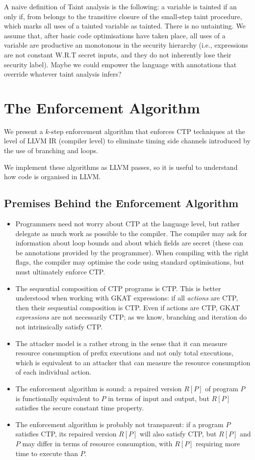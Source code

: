 A naive definition of Taint analysis is the following: a variable is tainted if an only if, from belongs to the transitive closure of the small-step taint procedure, which marks all uses of a tainted variable as tainted. There is no untainting. We assume that, after basic code optimisations have taken place, all uses of a variable are productive an monotonous in the security hierarchy (i.e., expressions are not constant W.R.T secret inputs, and they do not inherently lose their security label). Maybe we could empower the language with annotations that override whatever taint analysis infers?

\section{The Enforcement Algorithm}
We present a $k$-step  
enforcement algorithm that enforces CTP techniques at the level of LLVM IR (compiler level) to eliminate timing side channels introduced by the use of branching and loops. 

We implement these algorithms as LLVM passes, so it is useful to understand how code is organised in LLVM.

\subsection{Premises Behind the Enforcement Algorithm}
\begin{itemize}
\item Programmers need not worry about CTP at the language level, but rather delegate as much work as possible to the compiler. The compiler may ask for information about loop bounds and about which fields are secret (these can be annotations provided by the programmer). When compiling with the right flags, the compiler may optimise the code using standard optimisations, but must ultimately enforce CTP.
\item The sequential composition of CTP programs is CTP.  This is better understood when working with GKAT expressions: if all \emph{actions} are CTP, then their sequential composition is CTP. Even if actions are CTP, GKAT \emph{expressions} are not necessarily CTP; as we know, branching and iteration do not intrinsically satisfy CTP.
\item The attacker model is a rather strong in the sense that it can measure resource consumption of prefix executions and not only total executions, which is equivalent to an attacker that can measure the resource consumption of each individual action.
\item The enforcement algorithm is sound: a repaired version $R[P]$ of program $P$ is functionally equivalent to $P$ in terms of input and output, but $R[P]$ satisfies the secure constant time property.
\item The enforcement algorithm is probably not transparent: if a program $P$ satisfies CTP, its repaired version $R[P]$ will also satisfy CTP, but $R[P]$ and $P$ may differ in terms of resource consumption, with $R[P]$ requiring more time to execute than $P$. 
\end{itemize}

